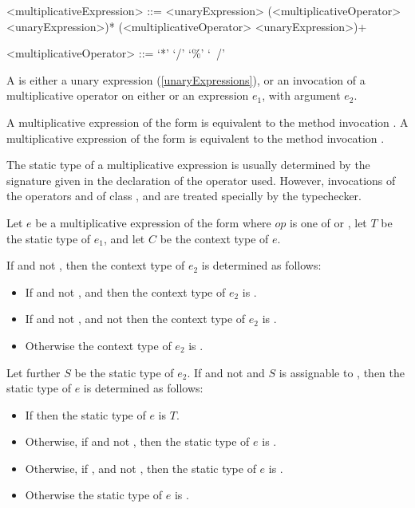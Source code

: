 \documentclass[makeidx]{article}
\begin{document}
{\begin{grammar}
<multiplicativeExpression> ::= \gnewline{}
  <unaryExpression> (<multiplicativeOperator> <unaryExpression>)*
  \alt \SUPER{} (<multiplicativeOperator> <unaryExpression>)+

<multiplicativeOperator> ::= `*'
  \alt `/'
  \alt `\%'
  \alt `~/'
\end{grammar}

\LMHash{}%
A  is either a unary expression
(\ref{unaryExpressions}),
or an invocation of a multiplicative operator
on either \SUPER{} or an expression $e_1$,
with argument $e_2$.

\LMHash{}%
A multiplicative expression of the form 
is equivalent to the method invocation .
A multiplicative expression of the form 
is equivalent to the method invocation .

\LMHash{}%
The static type of a multiplicative expression is usually determined
by the signature given in the declaration of the operator used.
However, invocations of the operators \code{*} and \code{\%} of
class ,  and 
are treated specially by the typechecker.

\LMHash{}%
Let $e$ be a multiplicative expression of the form 
where $op$ is one of \code{*} or \code{\%},
let $T$ be the static type of $e_1$,
and let $C$ be the context type of $e$.

If  and not , then
the context type of $e_2$ is determined as follows:
\begin{itemize}
  \item{} If  and not ,
      and 
      then the context type of $e_2$ is .
  \item{} If  and not ,
      and not 
     then the context type of $e_2$ is .
  \item{} Otherwise the context type of $e_2$ is .
\end{itemize}
Let further $S$ be the static type of $e_2$.
If  and not 
and $S$ is assignable to ,
then the static type of $e$ is determined as follows:
\begin{itemize}
  \item{} If 
    then the static type of $e$ is $T$.
  \item{} Otherwise, if 
    and not ,
    then the static type of $e$ is .
  \item{} Otherwise, if ,
     and not ,
    then the static type of $e$ is .
  \item{} Otherwise the static type of $e$ is .
\end{itemize}


}
\end{document}
